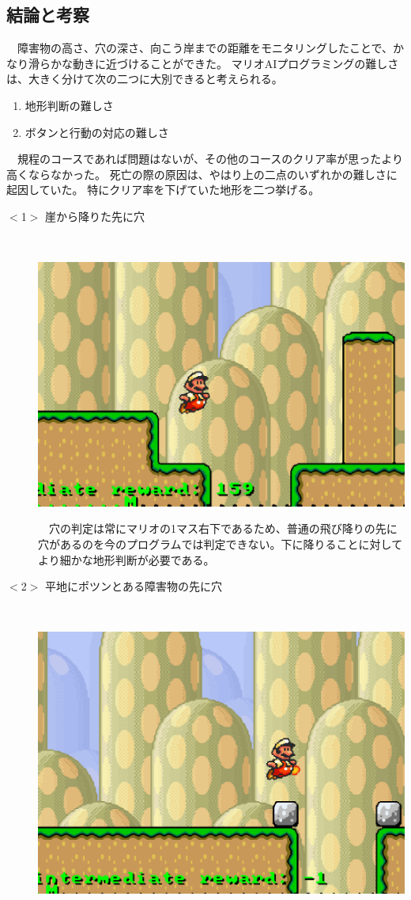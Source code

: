 \documentclass[a4j]{jarticle}
\begin{document}
\subsection{結論と考察}
　障害物の高さ、穴の深さ、向こう岸までの距離をモニタリングしたことで、かなり滑らかな動きに近づけることができた。
マリオAIプログラミングの難しさは、大きく分けて次の二つに大別できると考えられる。
\begin{enumerate}
\item 地形判断の難しさ
\item ボタンと行動の対応の難しさ
\end{enumerate}
　規程のコースであれば問題はないが、その他のコースのクリア率が思ったより高くならなかった。
死亡の際の原因は、やはり上の二点のいずれかの難しさに起因していた。
特にクリア率を下げていた地形を二つ挙げる。
\begin{description}
  \item [$<$1$>$ 崖から降りた先に穴] ~\\
\begin{center}
\includegraphics[scale=0.70]{figure02.eps}
\end{center}
　穴の判定は常にマリオの1マス右下であるため、普通の飛び降りの先に穴があるのを今のプログラムでは判定できない。下に降りることに対してより細かな地形判断が必要である。
　\item[$<$2$>$ 平地にポツンとある障害物の先に穴]~\\
\begin{center}
\includegraphics[scale=0.70]{figure03.eps}

\end{center}
\end{description}
\end{document}
